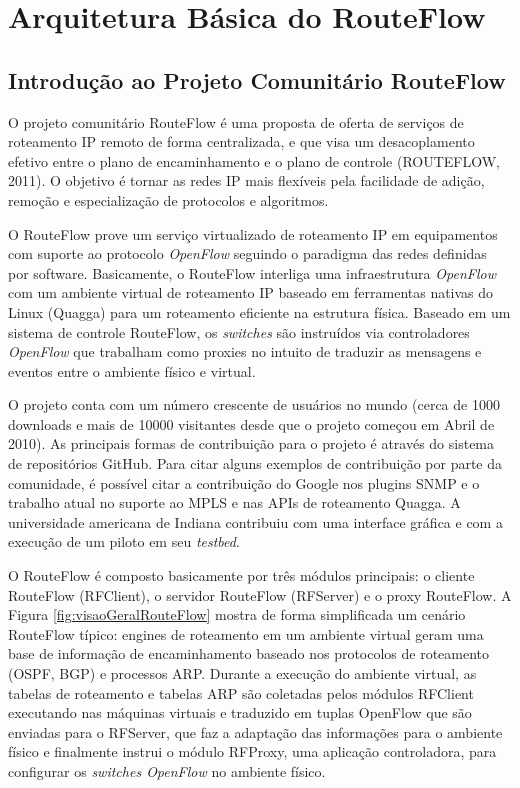 \chapter{Arquitetura Básica do RouteFlow}

\section{Introdução ao Projeto Comunitário RouteFlow}

O projeto comunitário RouteFlow é uma proposta de oferta de serviços de
roteamento IP remoto de forma centralizada, e que visa um
desacoplamento efetivo entre o plano de encaminhamento e o
plano de controle (ROUTEFLOW, 2011). O objetivo é tornar as
redes IP mais flexíveis pela facilidade de adição,
remoção e especialização de protocolos e algoritmos.


O RouteFlow prove um serviço virtualizado de roteamento IP
em equipamentos com suporte ao protocolo \textit{OpenFlow}
seguindo o paradigma das redes definidas por software.
Basicamente, o RouteFlow interliga uma infraestrutura 
\textit{OpenFlow} com um ambiente virtual de roteamento 
IP baseado em ferramentas nativas do Linux (Quagga) para
um roteamento eficiente na estrutura física. Baseado em um
sistema de controle RouteFlow, os \textit{switches} 
são instruídos via controladores \textit{OpenFlow} que 
trabalham como proxies no intuito de traduzir as mensagens
e eventos entre o ambiente físico e virtual. 

O projeto conta com um número crescente de usuários no 
mundo (cerca de 1000 downloads e mais de 10000 visitantes
desde que o projeto começou em Abril de 2010). As principais
formas de contribuição para o projeto é através do sistema
de repositórios GitHub. Para citar alguns exemplos de contribuição
por parte da comunidade, é possível citar a contribuição
do Google nos plugins SNMP e o trabalho atual no suporte
ao MPLS e nas APIs de roteamento Quagga. A universidade
americana de Indiana contribuiu com uma interface gráfica
e com a execução de um piloto em seu \textit{testbed}.


O RouteFlow é composto basicamente por três módulos principais:
o cliente RouteFlow (RFClient), o servidor RouteFlow (RFServer) e
o proxy RouteFlow. A Figura \ref{fig:visaoGeralRouteFlow} mostra
de forma simplificada um cenário RouteFlow típico: engines de 
roteamento em um ambiente virtual geram uma base de 
informação de encaminhamento baseado nos protocolos 
de roteamento (OSPF, BGP) e processos ARP. Durante a 
execução do ambiente virtual, as tabelas de roteamento e 
tabelas ARP são coletadas pelos módulos RFClient executando
nas máquinas virtuais e traduzido em tuplas OpenFlow que
são enviadas para o RFServer, que faz a adaptação das 
informações para o ambiente físico e finalmente instrui o 
módulo RFProxy, uma aplicação controladora, para configurar
os \textit{switches OpenFlow} no ambiente físico.

